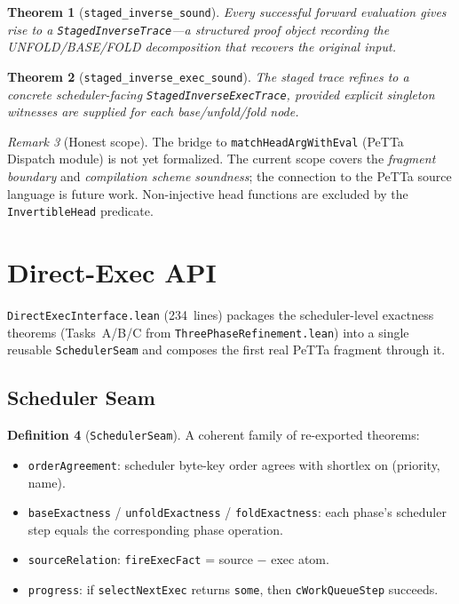 \documentclass[11pt]{article}
\newtheorem{theorem}{Theorem}[section]
\theoremstyle{definition}
\newtheorem{definition}[theorem]{Definition}
\theoremstyle{remark}
\newtheorem{remark}[theorem]{Remark}
\begin{document}
\begin{theorem}[\texttt{staged\_inverse\_sound}]
Every successful forward evaluation gives rise to a
\texttt{StagedInverseTrace}---a structured proof object recording the
UNFOLD/BASE/FOLD decomposition that recovers the original input.
\end{theorem}

\begin{theorem}[\texttt{staged\_inverse\_exec\_sound}]
The staged trace refines to a concrete scheduler-facing
\texttt{StagedInverseExecTrace}, provided explicit singleton witnesses
are supplied for each base/unfold/fold node.
\end{theorem}

\begin{remark}[Honest scope]
The bridge to \texttt{matchHeadArgWithEval} (PeTTa Dispatch module) is
not yet formalized.  The current scope covers the \emph{fragment boundary}
and \emph{compilation scheme soundness}; the connection to the PeTTa
source language is future work.  Non-injective head functions are
excluded by the \texttt{InvertibleHead} predicate.
\end{remark}

\section{Direct-Exec API}
\label{sec:directexec}

\texttt{DirectExecInterface.lean} (234~lines) packages the scheduler-level
exactness theorems (Tasks~A/B/C from \texttt{ThreePhaseRefinement.lean})
into a single reusable \texttt{SchedulerSeam} and composes the first
real PeTTa fragment through it.

\subsection{Scheduler Seam}

\begin{definition}[\texttt{SchedulerSeam}]
A coherent family of re-exported theorems:
\begin{itemize}[nosep]
  \item \texttt{orderAgreement}: scheduler byte-key order agrees with
        shortlex on (priority, name).
  \item \texttt{baseExactness} / \texttt{unfoldExactness} /
        \texttt{foldExactness}: each phase's scheduler step equals the
        corresponding phase operation.
  \item \texttt{sourceRelation}: \texttt{fireExecFact} = source $-$ exec
        atom.
  \item \texttt{progress}: if \texttt{selectNextExec} returns \texttt{some},
        then \texttt{cWorkQueueStep} succeeds.
\end{itemize}
\end{definition}
\end{document}
